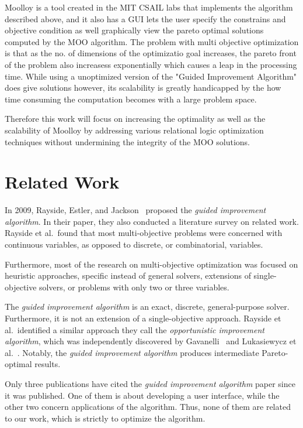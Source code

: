 \documentclass[11pt]{article}
\begin{document}
Moolloy is a tool created in the MIT CSAIL labs that implements the algorithm described above, and it also has a GUI lets the user specify the constrains and objective condition as well graphically view the pareto optimal solutions computed by the MOO algorithm. The problem with multi objective optimization is that as the no. of dimensions of the optimizatio goal increases, the pareto front of the problem also increasess  exponentially which causes a leap in the processing time. While using a unoptimized version of the "Guided Improvement Algorithm" does give solutions however, its scalability is greatly handicapped by the how time consuming the computation becomes with a large problem space.

Therefore this work will focus on increasing the optimality as well as the scalability of Moolloy by addressing various relational logic optimization techniques without undermining the integrity of the MOO solutions.

\section{Related Work}

In 2009, Rayside, Estler, and Jackson~\cite{ref:moolloy} proposed the
\textit{guided improvement algorithm}. In their paper, they also
conducted a literature survey on related work. Rayside et al.\ found
that most multi-objective problems were concerned with continuous
variables, as opposed to discrete, or combinatorial, variables.

Furthermore, most of the research on multi-objective optimization was
focused on heuristic approaches, specific instead of general solvers,
extensions of single-objective solvers, or problems with only two or
three variables.

The \textit{guided improvement algorithm} is an exact, discrete,
general-purpose solver. Furthermore, it is not an extension of a
single-objective approach. Rayside et al.\ identified a similar
approach they call the \textit{opportunistic improvement algorithm},
which was independently discovered by Gavanelli~\cite{ref:Gavanelli02}
and Lukasiewycz et al.~\cite{ref:lukas07}. Notably, the \textit{guided
improvement algorithm} produces intermediate Pareto-optimal results.

Only three publications have cited the \textit{guided improvement
algorithm} paper since it was published. One of them is about
developing a user interface, while the other two concern applications
of the algorithm. Thus, none of them are related to our work, which is
strictly to optimize the algorithm.
\end{document}
